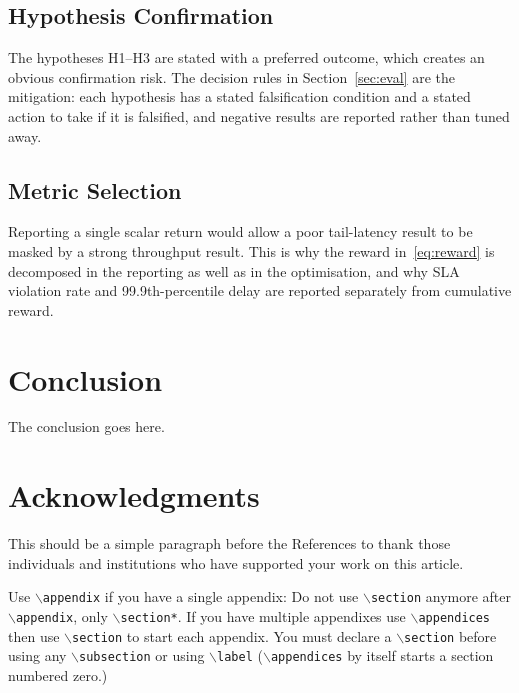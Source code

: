 \documentclass[journal]{IEEEtran}
\begin{document}
\subsection{Hypothesis Confirmation}
The hypotheses H1--H3 are stated with a preferred outcome, which
creates an obvious confirmation risk. The decision rules in
Section~\ref{sec:eval} are the mitigation: each hypothesis has a
stated falsification condition and a stated action to take if it is
falsified, and negative results are reported rather than tuned away.
 
\subsection{Metric Selection}
Reporting a single scalar return would allow a poor tail-latency result
to be masked by a strong throughput result. This is why the reward
in~\eqref{eq:reward} is decomposed in the reporting as well as in the
optimisation, and why SLA violation rate and 99.9th-percentile delay
are reported separately from cumulative reward.

\section{Conclusion}
The conclusion goes here.


\section*{Acknowledgments}
This should be a simple paragraph before the References to thank those individuals and institutions who have supported your work on this article.



{
Use $\backslash${\tt{appendix}} if you have a single appendix:
Do not use $\backslash${\tt{section}} anymore after $\backslash${\tt{appendix}}, only $\backslash${\tt{section*}}.
If you have multiple appendixes use $\backslash${\tt{appendices}} then use $\backslash${\tt{section}} to start each appendix.
You must declare a $\backslash${\tt{section}} before using any $\backslash${\tt{subsection}} or using $\backslash${\tt{label}} ($\backslash${\tt{appendices}} by itself
 starts a section numbered zero.)}



\end{document}
